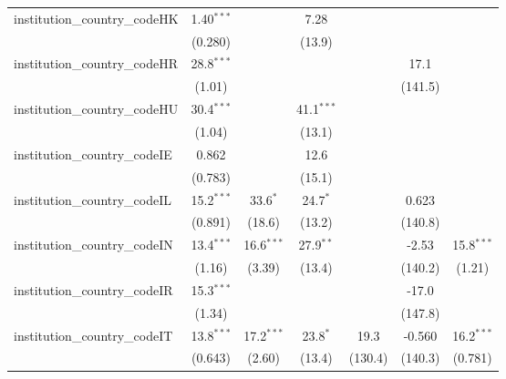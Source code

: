 \begin{tabular}{lcccccc}
   institution\_country\_codeHK          & 1.40$^{***}$  &              & 7.28         &               &               &   \\   
                                         & (0.280)       &              & (13.9)       &               &               &   \\   
   institution\_country\_codeHR          & 28.8$^{***}$  &              &              &               & 17.1          &   \\   
                                         & (1.01)        &              &              &               & (141.5)       &   \\   
   institution\_country\_codeHU          & 30.4$^{***}$  &              & 41.1$^{***}$ &               &               &   \\   
                                         & (1.04)        &              & (13.1)       &               &               &   \\   
   institution\_country\_codeIE          & 0.862         &              & 12.6         &               &               &   \\   
                                         & (0.783)       &              & (15.1)       &               &               &   \\   
   institution\_country\_codeIL          & 15.2$^{***}$  & 33.6$^{*}$   & 24.7$^{*}$   &               & 0.623         &   \\   
                                         & (0.891)       & (18.6)       & (13.2)       &               & (140.8)       &   \\   
   institution\_country\_codeIN          & 13.4$^{***}$  & 16.6$^{***}$ & 27.9$^{**}$  &               & -2.53         & 15.8$^{***}$\\   
                                         & (1.16)        & (3.39)       & (13.4)       &               & (140.2)       & (1.21)\\   
   institution\_country\_codeIR          & 15.3$^{***}$  &              &              &               & -17.0         &   \\   
                                         & (1.34)        &              &              &               & (147.8)       &   \\   
   institution\_country\_codeIT          & 13.8$^{***}$  & 17.2$^{***}$ & 23.8$^{*}$   & 19.3          & -0.560        & 16.2$^{***}$\\   
                                         & (0.643)       & (2.60)       & (13.4)       & (130.4)       & (140.3)       & (0.781)\\   

\end{tabular}
